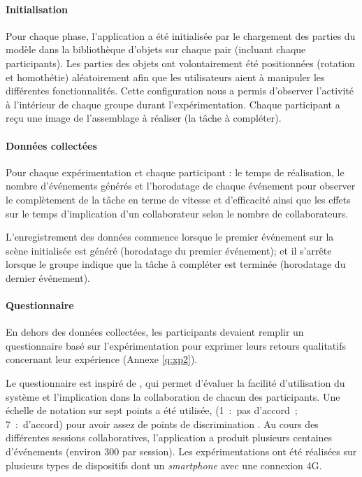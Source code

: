 \paragraph{Initialisation}

Pour chaque phase, l'application a été initialisée par le chargement des parties du 
modèle dans la bibliothèque d'objets sur chaque pair (incluant chaque 
participants). Les parties des 
objets ont volontairement été positionnées (rotation et homothétie) aléatoirement 
afin que les utilisateurs aient à manipuler les différentes fonctionnalités. Cette 
configuration nous a permis d'observer l'activité à l'intérieur de chaque groupe 
durant l'expérimentation. Chaque participant a reçu une image de l'assemblage à 
réaliser (la tâche à compléter). 

\paragraph{Données collectées}
Pour chaque expérimentation et chaque participant : le temps de réalisation, le 
nombre d'événements générés et l'horodatage de chaque événement pour 
observer le complètement de la tâche en terme de vitesse et d'efficacité ainsi 
que les effets sur le temps d'implication d'un collaborateur selon le nombre de 
collaborateurs. 

L'enregistrement des données commence lorsque le premier événement sur la 
scène initialisée est généré (horodatage du premier événement); et il s'arrête 
lorsque le groupe indique que la tâche à compléter est terminée (horodatage du 
dernier événement).


\paragraph{Questionnaire}
En dehors des données collectées, les participants devaient remplir un 
questionnaire basé sur l'expérimentation pour exprimer leurs retours qualitatifs 
concernant leur expérience (Annexe \ref{q:xp2}). 

Le questionnaire est inspiré de \cite{Lewis1995}, qui permet d'évaluer la facilité 
d'utilisation du système et l'implication dans la collaboration de chacun des 
participants. Une échelle de notation sur sept points a été utilisée, 
(1~:~pas d'accord~; 7~:~d'accord) pour avoir assez de points de discrimination \cite{Lewis1993}.
Au cours des différentes sessions collaboratives, l'application a produit plusieurs 
centaines d'événements (environ 300 par session). Les expérimentations ont été 
réalisées sur plusieurs types de dispositifs dont un \textit{smartphone} avec une 
connexion 4G. 



